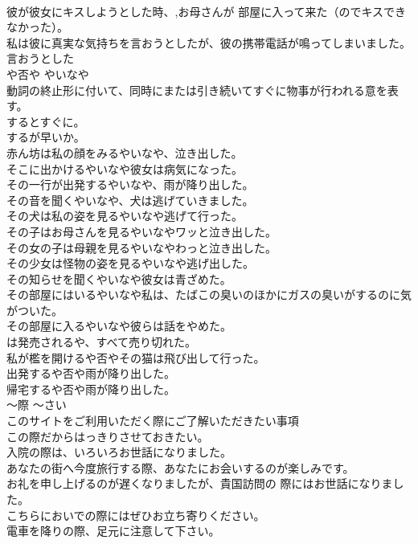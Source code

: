 \documentclass[8pt]{extreport}
\begin{document}
\begin{CJK}{UTF8}{min}
\\	彼が彼女にキスしようとした時、,お母さんが 部屋に入って来た（のでキスできなかった）。  
\\	私は彼に真実な気持ちを言おうとしたが、彼の携帯電話が鳴ってしまいました。言おうとした  
\\	や否や	やいなや	
\\	動詞の終止形に付いて、同時にまたは引き続いてすぐに物事が行われる意を表す。
\\	するとすぐに。
\\	するが早いか。	
\\	赤ん坊は私の顔をみるやいなや、泣き出した。  
\\	そこに出かけるやいなや彼女は病気になった。   
\\	その一行が出発するやいなや、雨が降り出した。   
\\	その音を聞くやいなや、犬は逃げていきました。   
\\	その犬は私の姿を見るやいなや逃げて行った。   
\\	その子はお母さんを見るやいなやワッと泣き出した。   
\\	その女の子は母親を見るやいなやわっと泣き出した。  
\\	その少女は怪物の姿を見るやいなや逃げ出した。   
\\	その知らせを聞くやいなや彼女は青ざめた。   
\\	その部屋にはいるやいなや私は、たばこの臭いのほかにガスの臭いがするのに気がついた。   
\\	その部屋に入るやいなや彼らは話をやめた。   
\\	は発売されるや、すべて売り切れた。  
\\	私が檻を開けるや否やその猫は飛び出して行った。  
\\	出発するや否や雨が降り出した。  
\\	帰宅するや否や雨が降り出した。  
\\	〜際	〜さい	
\\	このサイトをご利用いただく際にご了解いただきたい事項  
\\	この際だからはっきりさせておきたい。  
\\	入院の際は、いろいろお世話になりました。  
\\	あなたの街へ今度旅行する際、あなたにお会いするのが楽しみです。   
\\	お礼を申し上げるのが遅くなりましたが、貴国訪問の 際にはお世話になりました。  
\\	こちらにおいでの際にはぜひお立ち寄りください。   
\\	電車を降りの際、足元に注意して下さい。  

\end{CJK}
\end{document}

